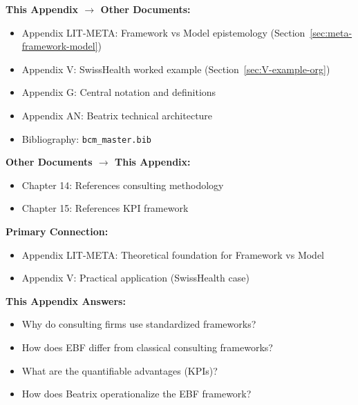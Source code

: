 
\begin{tcolorbox}[colback=gray!5!white, colframe=gray!75!black,
    title=\textbf{Cross-Reference Map}]

\textbf{This Appendix $\rightarrow$ Other Documents:}
\begin{itemize}[nosep]
    \item Appendix LIT-META: Framework vs Model epistemology (Section~\ref{sec:meta-framework-model})
    \item Appendix V: SwissHealth worked example (Section~\ref{sec:V-example-org})
    \item Appendix G: Central notation and definitions
    \item Appendix AN: Beatrix technical architecture
    \item Bibliography: \texttt{bcm\_master.bib}
\end{itemize}

\textbf{Other Documents $\rightarrow$ This Appendix:}
\begin{itemize}[nosep]
    \item Chapter 14: References consulting methodology
    \item Chapter 15: References KPI framework
\end{itemize}

\end{tcolorbox}

\begin{tcolorbox}[colback=purple!5!white, colframe=purple!75!black,
    title=Chapter Linkage]

\textbf{Primary Connection:}
\begin{itemize}[nosep]
\item Appendix LIT-META: Theoretical foundation for Framework vs Model
\item Appendix V: Practical application (SwissHealth case)
\end{itemize}

\textbf{This Appendix Answers:}
\begin{itemize}[nosep]
\item Why do consulting firms use standardized frameworks?
\item How does EBF differ from classical consulting frameworks?
\item What are the quantifiable advantages (KPIs)?
\item How does Beatrix operationalize the EBF framework?
\end{itemize}

\end{tcolorbox}

